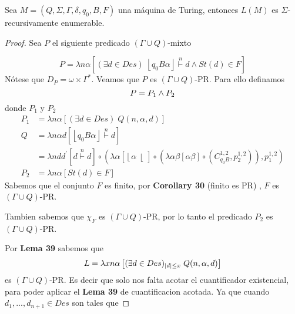  \begin{theorem}
  	\PN Sea $M = \left(Q, \Sigma, \Gamma, \delta, q_{0}, B, F\right)$ una máquina de Turing, entonces $L(M)$ es
    $\Sigma$-recursivamente enumerable.
  \end{theorem}
  \begin{proof}
     Sea $P$ el siguiente predicado $(\Gamma \cup Q)$-mixto

    \[
      P = \lambda n\alpha \left[ (\exists d\in Des)\;\left\lfloor q_{0}B\alpha \right\rfloor \overset{n}{\vdash }d\wedge
        St(d)\in F\right]
    \]
    Nótese que $D_{P}=\omega \times \Gamma ^{\ast }$. Veamos que $P$ es $(\Gamma \cup Q)$-PR. Para ello definamos
    \[
      P = P_1 \land P_2 \\[20pt]
    \]
    donde $P_1$ y $P_2$
    \begin{align*}
      P_1 &=  \lambda n\alpha \left[ (\exists d\in Des)\; Q(n, \alpha, d)\right] \\[10pt]
        Q &=  \lambda n \alpha d \left[ \left\lfloor q_{0}B\alpha \right\rfloor \overset{n}{\vdash }d \right] \\
          &=  \lambda n d d^{\prime} \left[ d \overset{n}{\vdash}d \right]
                \circ (
                  \lambda \alpha \left[ \left\lfloor \alpha \right\lfloor \right]
                    \circ(
                      \lambda \alpha \beta \left[ \alpha \beta \right]
                        \circ (
                          C_{q_0 B}^{1,2},
                          p_{2}^{1,2}
                        )
                  ),
                  p_{1}^{1,2}
                ) \\[30pt]
      P_2 &=  \lambda n\alpha \left[ St(d)\in F \right]
    \end{align*}
    Sabemos que el conjunto $F$ es finito, por \textbf{Corollary 30} (finito es PR) , $F$ es $(\Gamma \cup Q)$-PR.

    \noindent Tambien sabemos que $\chi_F$ es $(\Gamma \cup Q)$-PR, por lo tanto el predicado $P_2$ es
    $(\Gamma \cup Q)$-PR.

    \noindent Por \textbf{Lema 39} sabemos que
    \[
      L = \lambda x n\alpha \left[ (\exists d\in Des)_{|d| \leq x}\; Q(n, \alpha, d)\right] \\[10pt]
    \]
    es $(\Gamma \cup Q)$-PR.
    Es decir que solo nos falta acotar el cuantificador existencial, para poder aplicar el \textbf{Lema 39} de
    cuantificacion acotada. Ya que cuando \( d_{1},...,d_{n+1}\in Des\) son tales que


\end{proof}

